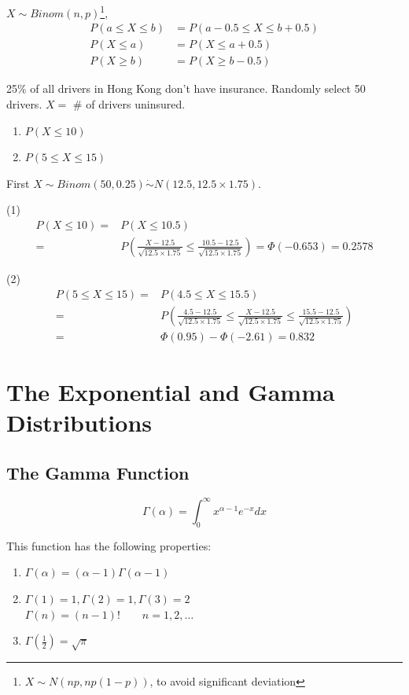 $X \sim Binom(n,p)$\footnote{$X \sim N(np,np(1-p))$, to avoid significant deviation},
\begin{align*}
P(a \leq X \leq b)&=P(a-0.5 \leq X \leq b+0.5)  \\
P(X \leq a) &= P(X \leq a+0.5)	\\
P(X \geq b) &= P(X \geq b-0.5)
\end{align*}

\begin{exmp}
25\% of all drivers in Hong Kong don't have insurance. Randomly select 50 drivers. $X=$ \# of drivers uninsured.

\begin{enumerate}
\item $P(X \leq 10)$
\item $P(5 \leq X \leq 15)$ 
\end{enumerate}

First $X\sim Binom(50,0.25) \dot{\sim} N(12.5,12.5\times1.75)$.

(1) \begin{align*}
P(X\leq 10) =& P(X \leq 10.5) \\
=& P\left( \frac{X-12.5}{\sqrt{12.5\times1.75}}  \leq   \frac{10.5-12.5}{\sqrt{12.5\times1.75}}\right)=\Phi(-0.653)=0.2578
\end{align*}

(2) \begin{align*}
P(5 \leq X\leq 15) =& P(4.5 \leq X \leq 15.5) \\
=& P\left(\frac{4.5-12.5}{\sqrt{12.5\times1.75}} \leq \frac{X-12.5}{\sqrt{12.5\times1.75}}  \leq   \frac{15.5-12.5}{\sqrt{12.5\times1.75}}\right)	\\
=&\Phi(0.95)-\Phi(-2.61)=0.832
\end{align*}
\end{exmp}

\section{The Exponential and Gamma Distributions}
\subsection{The Gamma Function}
\begin{defn}
\[\Gamma(\alpha)=\int_0^{\infty} x^{\alpha-1}e^{-x} dx\]
\end{defn}

This function has the following properties:
\begin{enumerate}
\item $\Gamma(\alpha)=(\alpha-1)\Gamma(\alpha-1)$
\item $\Gamma(1)=1,\Gamma(2)=1,\Gamma(3)=2$\\
$\Gamma(n)=(n-1)! \qquad n=1,2,\dots$
\item $\Gamma(\frac{1}{2})=\sqrt{\pi}$
\end{enumerate}

